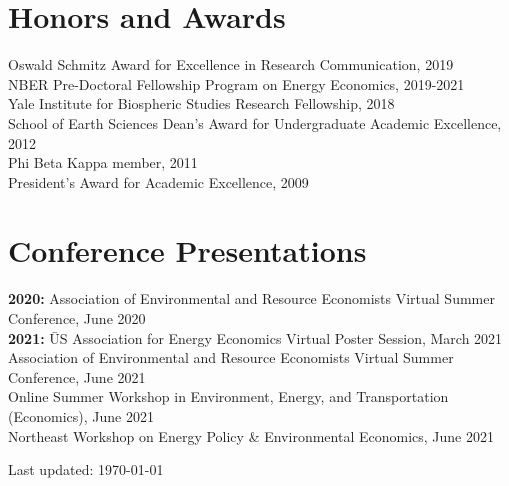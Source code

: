 \documentclass[letterpaper]{article}
\def\footerlink{}
\begin{document}
\section*{Honors and Awards}
Oswald Schmitz Award for Excellence in Research Communication, 2019\\
NBER Pre-Doctoral Fellowship Program on Energy Economics, 2019-2021\\
Yale Institute for Biospheric Studies Research Fellowship, 2018\\
School of Earth Sciences Dean's Award for Undergraduate Academic Excellence, 2012\\
Phi Beta Kappa member, 2011\\
President's Award for Academic Excellence, 2009

\section*{Conference Presentations}
\begin{tabbing}
\textbf{2020:} Association of Environmental and Resource Economists Virtual Summer Conference, June 2020\\
\textbf{2021:}  \= US Association for Energy Economics Virtual Poster Session, March 2021\\
\> Association of Environmental and Resource Economists Virtual Summer Conference, June 2021 \\
\> Online Summer Workshop in Environment, Energy, and Transportation (Economics), June 2021 \\
\> Northeast Workshop on Energy Policy \& Environmental Economics, June 2021 \\
\end{tabbing}
\bigskip

\begin{center}
  \begin{footnotesize}
    Last updated: \today \\
    \href{\footerlink}{\texttt{\footerlink}}
  \end{footnotesize}
\end{center}
\end{document}
